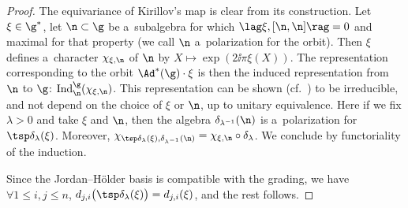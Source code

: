\begin{proof}
 The equivariance of Kirillov's map is clear from its construction. Let $\xi \in \g^*$, let $\n \subset \g$ be a~subalgebra for which $\lag\xi,[\n,\n]\rag = 0$ and maximal for that property (we call $\n$ a~polarization for the orbit). Then $\xi$ defines a~character $\chi_{\xi,\n}$ of $\n$ by $X \mapsto \exp(2\ii \pi \xi(X))$. The representation corresponding to the orbit $\Ad^*(\g)\cdot \xi$ is then the induced representation from $\n$ to $\g$: $\mathrm{Ind}_{\n}^{\g}(\chi_{\xi,\n})$. This representation can be shown (cf.\ \cite{Kirillov}) to be irreducible, and not depend on the choice of $\xi$ or $\n$, up to unitary equivalence. Here if we fix $\lambda > 0$ and take $\xi$ and $\n$, then the algebra $\delta_{\lambda^{-1}}(\n)$ is a~polarization for $\tsp\delta_{\lambda}(\xi)$. Moreover, $\chi_{\tsp\delta_{\lambda}(\xi),\delta_{\lambda^{-1}}(\n)} = \chi_{\xi,\n}\circ \delta_{\lambda}$.
 We conclude by functoriality of the induction.

 Since the Jordan--H\"older basis is compatible with the grading, we have $\forall 1\leq i, j\leq n$, $ d_{j,i}\bigl(\tsp\delta_{\lambda}(\xi)\bigr) = d_{j,i}(\xi)$,
 and the rest follows.
\end{proof}

























































































